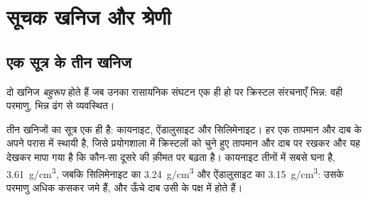 \section{सूचक खनिज और श्रेणी}

\subsection{एक सूत्र के तीन खनिज}

\begin{definition}[बहुरूप]\label{def:g12:metamorphic-rocks:polymorph}
दो खनिज \emph{बहुरूप} होते हैं जब उनका रासायनिक संघटन एक ही हो
पर क्रिस्टल संरचनाएँ भिन्न: वही परमाणु,
भिन्न ढंग से व्यवस्थित।
\end{definition}

तीन खनिजों का सूत्र  एक ही है: कायनाइट, ऐंडालुसाइट और
सिलिमेनाइट। हर एक तापमान और दाब के अपने परास में स्थायी है, जिसे
प्रयोगशाला में क्रिस्टलों को चुने हुए तापमान और दाब पर रखकर और यह देखकर मापा गया है
कि कौन-सा  दूसरे की क़ीमत पर बढ़ता है। कायनाइट तीनों में सबसे घना है,
\qty{3.61}{g/cm^3}, जबकि सिलिमेनाइट का \qty{3.24}{g/cm^3} और
ऐंडालुसाइट का \qty{3.15}{g/cm^3}: उसके परमाणु अधिक कसकर जमे हैं, और ऊँचे दाब
उसी के पक्ष में होते हैं।


